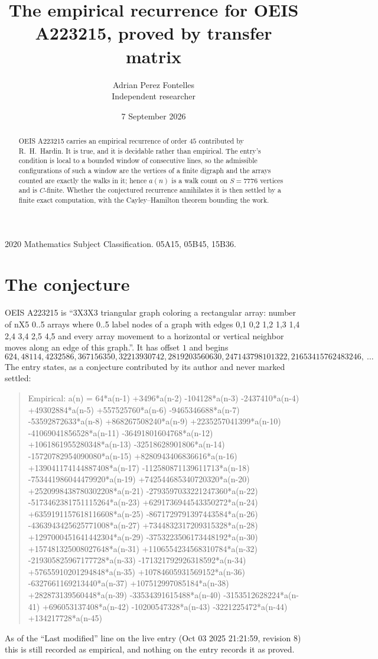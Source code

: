 \documentclass[11pt,a4paper]{article}
\title{The empirical recurrence for OEIS A223215, proved by transfer matrix}
\author{Adrian Perez Fontelles\\ \small Independent researcher}
\date{7 September 2026}
\theoremstyle{plain}
\theoremstyle{definition}
\begin{document}
\maketitle

\begin{abstract}
OEIS A223215 carries an empirical recurrence of order $45$ contributed by R.~H.~Hardin. It is
true, and it is decidable rather than empirical. The entry's condition is local to a bounded window of consecutive lines, so
the admissible configurations of such a window are the vertices of a finite digraph and the
arrays counted are exactly the walks in it; hence $a(n)$ is a walk count on $S=7776$ vertices
and is $C$-finite. Whether the conjectured recurrence annihilates it is then settled by a
finite exact computation, with the Cayley--Hamilton theorem bounding the work.
\end{abstract}

\noindent\small 2020 Mathematics Subject Classification. 05A15, 05B45, 15B36.\normalsize

\section{The conjecture}

OEIS A223215 is ``3X3X3 triangular graph coloring a rectangular array: number of nX5 0..5 arrays where 0..5 label nodes of a graph with edges 0,1 0,2 1,2 1,3 1,4 2,4 3,4 2,5 4,5 and every array movement to a horizontal or vertical neighbor moves along an edge of this graph.''. It has offset $1$ and begins
\[
624, 48114, 4232586, 367156350, 32213930742, 2819203560630, 247143798101322, 21653415762483246,\ \dots
\]
The entry states, as a conjecture contributed by its author and never marked settled:
\begin{quote}
Empirical: a(n) = 64*a(n-1) +3496*a(n-2) -104128*a(n-3) -2437410*a(n-4) +49302884*a(n-5) +557525760*a(n-6) -9465346688*a(n-7) -53592872633*a(n-8) +868267508240*a(n-9) +2235257041399*a(n-10) -41069041856528*a(n-11) -36491801604768*a(n-12) +1061861955280348*a(n-13) -32518628901806*a(n-14) -15720782954090080*a(n-15) +8280943406836616*a(n-16) +139041174144887408*a(n-17) -112580871139611713*a(n-18) -753441986044479920*a(n-19) +742544685340720320*a(n-20) +2520998438780302208*a(n-21) -2793597033221247360*a(n-22) -5173462381751115264*a(n-23) +6291736944543350272*a(n-24) +6359191157618116608*a(n-25) -8671729791397443584*a(n-26) -4363943425625771008*a(n-27) +7344832317209315328*a(n-28) +1297000451641442304*a(n-29) -3753223506173448192*a(n-30) +157481325008027648*a(n-31) +1106554234568310784*a(n-32) -219305825967177728*a(n-33) -171321792926318592*a(n-34) +57655910201294848*a(n-35) +10784605931569152*a(n-36) -6327661169213440*a(n-37) +107512997085184*a(n-38) +282873139560448*a(n-39) -33534391615488*a(n-40) -3153512628224*a(n-41) +696053137408*a(n-42) -10200547328*a(n-43) -3221225472*a(n-44) +134217728*a(n-45)
\end{quote}
As of the ``Last modified'' line on the live entry (Oct 03 2025 21:21:59, revision 8) this is still
recorded as empirical, and nothing on the entry records it as proved.
\end{document}
